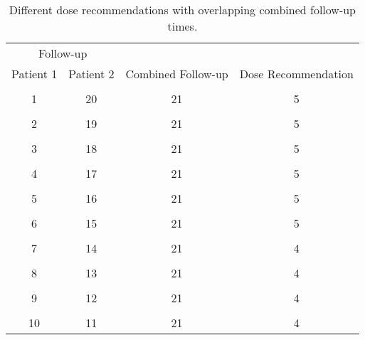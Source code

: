 \begin{table}[H]
	
	\caption{\label{tab_tite-dtp:TITEDTP_c2NNprob}Different dose recommendations with overlapping combined follow-up times.}
	\centering
	\fontsize{11}{13}\selectfont
	\begin{tabular}[t]{cccc}
		\toprule
		\multicolumn{2}{c}{Follow-up} & \multicolumn{2}{c}{ } \\
		\cmidrule(l{3pt}r{3pt}){1-2}
		Patient 1 & Patient 2 & Combined Follow-up & Dose Recommendation\\
		\midrule
		\cellcolor{gray!6}{1} & \cellcolor{gray!6}{19} & \cellcolor{gray!6}{20} & \cellcolor{gray!6}{5}\\
		1 & 20 & 21 & 5\\
		\cellcolor{gray!6}{2} & \cellcolor{gray!6}{18} & \cellcolor{gray!6}{20} & \cellcolor{gray!6}{5}\\
		2 & 19 & 21 & 5\\
		\cellcolor{gray!6}{3} & \cellcolor{gray!6}{17} & \cellcolor{gray!6}{20} & \cellcolor{gray!6}{4}\\
		3 & 18 & 21 & 5\\
		\cellcolor{gray!6}{4} & \cellcolor{gray!6}{16} & \cellcolor{gray!6}{20} & \cellcolor{gray!6}{4}\\
		4 & 17 & 21 & 5\\
		\cellcolor{gray!6}{5} & \cellcolor{gray!6}{15} & \cellcolor{gray!6}{20} & \cellcolor{gray!6}{4}\\
		5 & 16 & 21 & 5\\
		\cellcolor{gray!6}{6} & \cellcolor{gray!6}{14} & \cellcolor{gray!6}{20} & \cellcolor{gray!6}{4}\\
		6 & 15 & 21 & 5\\
		\cellcolor{gray!6}{7} & \cellcolor{gray!6}{13} & \cellcolor{gray!6}{20} & \cellcolor{gray!6}{4}\\
		7 & 14 & 21 & 4\\
		\cellcolor{gray!6}{8} & \cellcolor{gray!6}{12} & \cellcolor{gray!6}{20} & \cellcolor{gray!6}{4}\\
		8 & 13 & 21 & 4\\
		\cellcolor{gray!6}{9} & \cellcolor{gray!6}{11} & \cellcolor{gray!6}{20} & \cellcolor{gray!6}{4}\\
		9 & 12 & 21 & 4\\
		\cellcolor{gray!6}{10} & \cellcolor{gray!6}{10} & \cellcolor{gray!6}{20} & \cellcolor{gray!6}{4}\\
		10 & 11 & 21 & 4\\
		\bottomrule
	\end{tabular}
\end{table}

